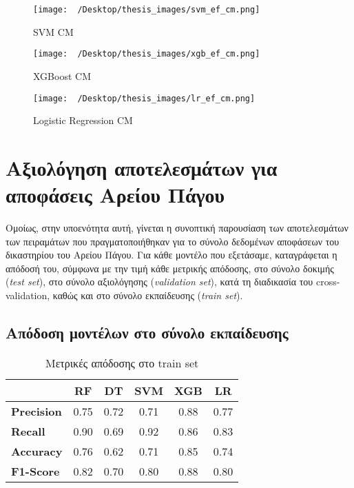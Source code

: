 \documentclass[diploma]{softlab-thesis}
\begin{document}
\begin{enumerate}
\begin{enumerate}
\begin{figure}[H]
    \centering
    \texttt{[image: ~/Desktop/thesis\_images/svm\_ef\_cm.png]} %
    \caption{SVM CM}
    \label{fig:your_image_label}
\end{figure}

\begin{figure}[H]
    \centering
    \texttt{[image: ~/Desktop/thesis\_images/xgb\_ef\_cm.png]} %
    \caption{XGBoost CM}
    \label{fig:your_image_label}
\end{figure}

\begin{figure}[H]
    \centering
    \texttt{[image: ~/Desktop/thesis\_images/lr\_ef\_cm.png]} %
    \caption{Logistic Regression CM}
    \label{fig:your_image_label}
\end{figure}


\section{Αξιολόγηση αποτελεσμάτων για αποφάσεις Αρείου Πάγου}

Ομοίως, στην υποενότητα αυτή, γίνεται η συνοπτική παρουσίαση των αποτελεσμάτων των πειραμάτων που πραγματοποιήθηκαν για το σύνολο δεδομένων αποφάσεων του δικαστηρίου του Αρείου Πάγου. Για κάθε μοντέλο που εξετάσαμε, καταγράφεται η απόδοσή του, σύμφωνα με την τιμή κάθε μετρικής απόδοσης, στο σύνολο δοκιμής (\textit{test set}), στο σύνολο αξιολόγησης (\textit{validation set}), κατά τη διαδικασία του cross-validation, καθώς και στο σύνολο εκπαίδευσης (\textit{train set}).

\subsection{Απόδοση μοντέλων στο σύνολο εκπαίδευσης}

\begin{table}[H]
\centering
\begin{tabular}{|l|c|c|c|c|c|}
\hline
       & \textbf{RF} & \textbf{DT} & \textbf{SVM} & \textbf{XGB} & \textbf{LR} \\ \hline
\textbf{Precision} & 0.75        & 0.72        & 0.71         & 0.88         & 0.77        \\ \hline
\textbf{Recall}    & 0.90        & 0.69        & 0.92         & 0.86        & 0.83        \\ \hline
\textbf{Accuracy}  & 0.76        & 0.62        & 0.71         & 0.85         & 0.74        \\ \hline
\textbf{F1-Score}  & 0.82        & 0.70        & 0.80         & 0.88         & 0.80        \\ \hline
\end{tabular}
\caption{Μετρικές απόδοσης στο train set}
\end{table}


\end{enumerate}
\end{enumerate}
\end{document}
